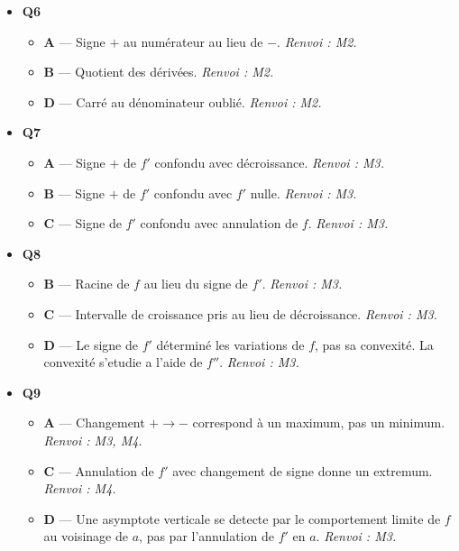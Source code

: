 \begin{itemize}
  \begin{itemize}
    \item \textbf{A} — Produit des dérivées au lieu de la formule Leibniz. \emph{Renvoi : M2.}
    \item \textbf{C} — Somme des dérivées. \emph{Renvoi : M2.}
    \item \textbf{D} — Signe moins (c'est le numérateur du quotient). \emph{Renvoi : M2.}
  \end{itemize}
  \item \textbf{Q6}
  \begin{itemize}
    \item \textbf{A} — Signe $+$ au numérateur au lieu de $-$. \emph{Renvoi : M2.}
    \item \textbf{B} — Quotient des dérivées. \emph{Renvoi : M2.}
    \item \textbf{D} — Carré au dénominateur oublié. \emph{Renvoi : M2.}
  \end{itemize}
  \item \textbf{Q7}
  \begin{itemize}
    \item \textbf{A} — Signe $+$ de $f'$ confondu avec décroissance. \emph{Renvoi : M3.}
    \item \textbf{B} — Signe $+$ de $f'$ confondu avec $f'$ nulle. \emph{Renvoi : M3.}
    \item \textbf{C} — Signe de $f'$ confondu avec annulation de $f$. \emph{Renvoi : M3.}
  \end{itemize}
  \item \textbf{Q8}
  \begin{itemize}
    \item \textbf{B} — Racine de $f$ au lieu du signe de $f'$. \emph{Renvoi : M3.}
    \item \textbf{C} — Intervalle de croissance pris au lieu de décroissance. \emph{Renvoi : M3.}
    \item \textbf{D} — Le signe de $f'$ déterminé les variations de $f$, pas sa convexité. La convexité s'etudie a l'aide de $f''$. \emph{Renvoi : M3.}
  \end{itemize}
  \item \textbf{Q9}
  \begin{itemize}
    \item \textbf{A} — Changement $+ \to -$ correspond à un maximum, pas un minimum. \emph{Renvoi : M3, M4.}
    \item \textbf{C} — Annulation de $f'$ avec changement de signe donne un extremum. \emph{Renvoi : M4.}
    \item \textbf{D} — Une asymptote verticale se detecte par le comportement limite de $f$ au voisinage de $a$, pas par l'annulation de $f'$ en $a$. \emph{Renvoi : M3.}

\end{itemize}
\end{itemize}
